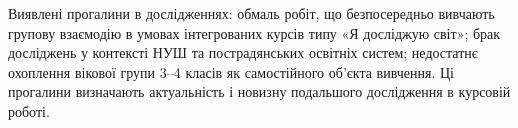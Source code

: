 \documentclass[a4paper,12pt]{article}
\begin{document}
Виявлені прогалини в дослідженнях: обмаль робіт, що безпосередньо вивчають групову взаємодію в умовах інтегрованих курсів типу «Я досліджую світ»; брак досліджень у контексті НУШ та пострадянських освітніх систем; недостатнє охоплення вікової групи 3--4 класів як самостійного об'єкта вивчення. Ці прогалини визначають актуальність і новизну подальшого дослідження в курсовій роботі.

\newpage


\printbibliography[title={Список використаних джерел}]
\end{document}
